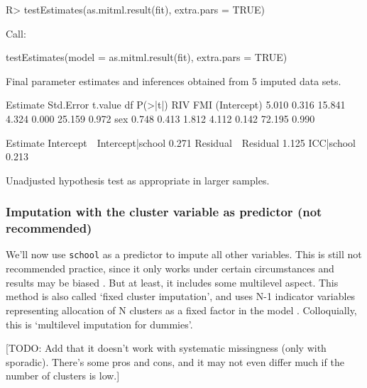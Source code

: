 \documentclass[
]{jss}
\begin{document}
\begin{CodeChunk}
\begin{CodeInput}
R> testEstimates(as.mitml.result(fit), extra.pars = TRUE)
\end{CodeInput}
\begin{CodeOutput}

Call:

testEstimates(model = as.mitml.result(fit), extra.pars = TRUE)

Final parameter estimates and inferences obtained from 5 imputed data sets.

             Estimate Std.Error   t.value        df   P(>|t|)       RIV       FMI 
(Intercept)     5.010     0.316    15.841     4.324     0.000    25.159     0.972 
sex             0.748     0.413     1.812     4.112     0.142    72.195     0.990 

                            Estimate 
Intercept~~Intercept|school    0.271 
Residual~~Residual             1.125 
ICC|school                     0.213 

Unadjusted hypothesis test as appropriate in larger samples.
\end{CodeOutput}
\end{CodeChunk}

\hypertarget{imputation-with-the-cluster-variable-as-predictor-not-recommended}{%
\subsubsection{Imputation with the cluster variable as predictor (not
recommended)}\label{imputation-with-the-cluster-variable-as-predictor-not-recommended}}

We'll now use \texttt{school} as a predictor to impute all other
variables. This is still not recommended practice, since it only works
under certain circumstances and results may be biased
\citep{drec15, ende16}. But at least, it includes some multilevel
aspect. This method is also called `fixed cluster imputation', and uses
N-1 indicator variables representing allocation of N clusters as a fixed
factor in the model \citep{reit06, ende16}. Colloquially, this is
`multilevel imputation for dummies'.

{[}TODO: Add that it doesn't work with systematic missingness (only with
sporadic). There's some pros and cons, and it may not even differ much
if the number of clusters is low.{]}
\end{document}
